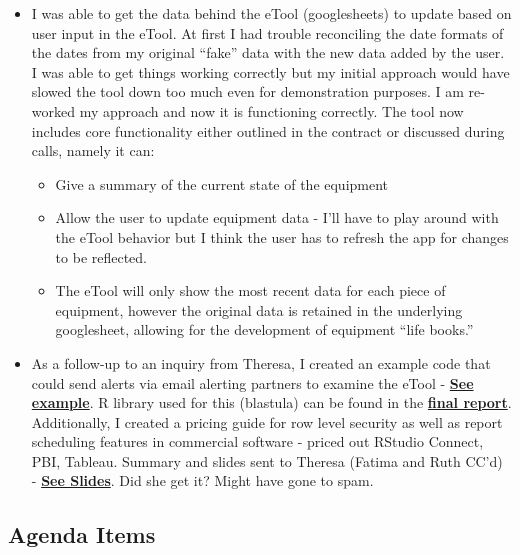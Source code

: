 \documentclass[]{article}
\providecommand{\tightlist}{%
  \setlength{\itemsep}{0pt}\setlength{\parskip}{0pt}}
\begin{document}
\begin{itemize}
\tightlist
\item
  I was able to get the data behind the eTool (googlesheets) to update
  based on user input in the eTool. At first I had trouble reconciling
  the date formats of the dates from my original ``fake'' data with the
  new data added by the user. I was able to get things working correctly
  but my initial approach would have slowed the tool down too much even
  for demonstration purposes. I am re-worked my approach and now it is
  functioning correctly. The tool now includes core functionality either
  outlined in the contract or discussed during calls, namely it can:

  \begin{itemize}
  \tightlist
  \item
    Give a summary of the current state of the equipment
  \item
    Allow the user to update equipment data - I'll have to play around
    with the eTool behavior but I think the user has to refresh the app
    for changes to be reflected.
  \item
    The eTool will only show the most recent data for each piece of
    equipment, however the original data is retained in the underlying
    googlesheet, allowing for the development of equipment ``life
    books.''
  \end{itemize}
\item
  As a follow-up to an inquiry from Theresa, I created an example code
  that could send alerts via email alerting partners to examine the
  eTool -
  \textbf{\href{https://github.com/paceafenet/etool_dev/blob/master/email_proof_of_concept.Rmd}{See
  example}}. R library used for this (blastula) can be found in the
  \textbf{\href{https://paceafenet.github.io/final_report/}{final
  report}}. Additionally, I created a pricing guide for row level
  security as well as report scheduling features in commercial software
  - priced out RStudio Connect, PBI, Tableau. Summary and slides sent to
  Theresa (Fatima and Ruth CC'd) -
  \textbf{\href{https://github.com/paceafenet/etool_dev/blob/master/Quick\%20Pricing\%20Guide\%20\%E2\%80\%93\%20analytics\%20reporting\%20tools.pptx}{See
  Slides}}. Did she get it? Might have gone to spam.
\end{itemize}

\hypertarget{agenda-items-9}{%
\subsection{Agenda Items}\label{agenda-items-9}}
\end{document}
